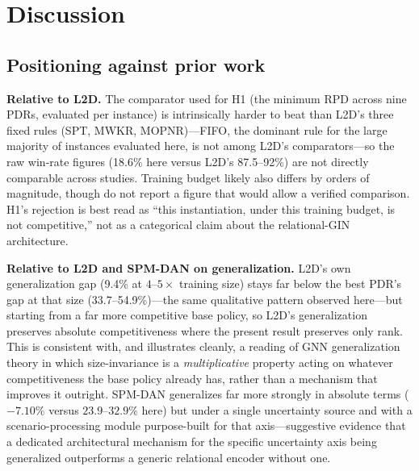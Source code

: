 \documentclass[11pt]{article}
\begin{document}
\section{Discussion}
\label{sec:discussion}

\subsection{Positioning against prior work}

\textbf{Relative to L2D.} The comparator used for H1 (the minimum RPD across nine PDRs, evaluated per instance) is intrinsically harder to beat than L2D's three fixed rules (SPT, MWKR, MOPNR)---FIFO, the dominant rule for the large majority of instances evaluated here, is not among L2D's comparators---so the raw win-rate figures (18.6\% here versus L2D's 87.5--92\%) are not directly comparable across studies. Training budget likely also differs by orders of magnitude, though \citet{zhang2020l2d} do not report a figure that would allow a verified comparison. H1's rejection is best read as ``this instantiation, under this training budget, is not competitive,'' not as a categorical claim about the relational-GIN architecture.

\textbf{Relative to L2D and SPM-DAN on generalization.} L2D's own generalization gap (9.4\% at $4$--$5\times$ training size) stays far below the best PDR's gap at that size (33.7--54.9\%)---the same qualitative pattern observed here---but starting from a far more competitive base policy, so L2D's generalization preserves absolute competitiveness where the present result preserves only rank. This is consistent with, and illustrates cleanly, a reading of GNN generalization theory \citep{xu2019gin} in which size-invariance is a \emph{multiplicative} property acting on whatever competitiveness the base policy already has, rather than a mechanism that improves it outright. SPM-DAN \citep{smit2025spmdan} generalizes far more strongly in absolute terms ($-7.10\%$ versus $23.9$--$32.9\%$ here) but under a single uncertainty source and with a scenario-processing module purpose-built for that axis---suggestive evidence that a dedicated architectural mechanism for the specific uncertainty axis being generalized outperforms a generic relational encoder without one.
\end{document}

